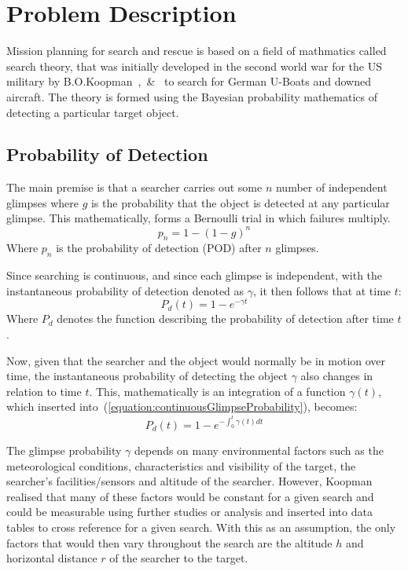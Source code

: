 \documentclass[10pt,a4paper, oneside, conference]{IEEEtran}
\begin{document}
	\section{Problem Description}	
	\label{section:problem}
	
	Mission planning for search and rescue is based on a field of mathmatics called search theory, that was initially developed in the second world war for the US military by B.O.Koopman~\cite{doi:10.1287/opre.4.3.324},~\cite{doi:10.1287/opre.4.5.503}\&~\cite{doi:10.1287/opre.5.5.613} to search for German U-Boats and downed aircraft. 
	The theory is formed using the Bayesian probability mathematics of detecting a particular target object. 
	
	\subsection{Probability of Detection}

	The main premise is that a searcher carries out some $n$ number of independent glimpses where $g$ is the probability that the object is detected at any particular glimpse. 
	This mathematically, forms a Bernoulli trial in which failures multiply.
	\begin{equation}
	\label{equation:glimpseProbability}
	p_n=1-(1-g)^n
	\end{equation}
	Where $p_n$ is the probability of detection (POD) after $n$ glimpses. 
	
	Since searching is continuous, and since each glimpse is independent, with the instantaneous probability of detection denoted as $\gamma$, it then follows that at time $t$:
	\begin{equation}
	\label{equation:continuousGlimpseProbability}
	P_d(t)=1-e^{-\gamma t}
	\end{equation}
	Where $P_d$ denotes the function describing the probability of detection after time $t$.
	
	Now, given that the searcher and the object would normally be in motion over time, the instantaneous probability of detecting the object $\gamma$ also changes in relation to time $t$.
	This, mathematically is an integration of a function $\gamma(t)$, which inserted into~(\ref{equation:continuousGlimpseProbability}), becomes:
	\begin{equation}
	\label{equation:integratedGlimpseProbability}
	P_d(t)=1-e^{-\int_{0}^{t} \gamma(t) dt}
	\end{equation}
	
	The glimpse probability $\gamma$ depends on many environmental factors such as the meteorological conditions, characteristics and visibility of the target, the searcher's facilities/sensors and altitude of the searcher.
	However, Koopman realised that many of these factors would be constant for a given search and could be measurable using further studies or analysis and inserted into data tables to cross reference for a given search.
	With this as an assumption, the only factors that would then vary throughout the search are the altitude $h$ and horizontal distance $r$ of the searcher to the target.
	
\end{document}
